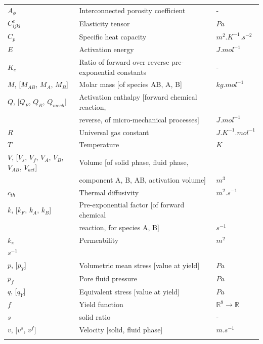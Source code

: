 \documentclass[]{scrreprt}
\begin{document}
\begin{table}
\begin{tabular}{lll}
\hline
$A_{\phi}$ & Interconnected porosity coefficient & - \\
$C^e_{ijkl}$ & Elasticity tensor & $Pa$ \\
$C_p$ & Specific heat capacity & $m^2.K^{-1}.s^{-2}$ \\
$E$ & Activation energy & $J.mol^{-1}$ \\
$K_c$ & Ratio of forward over reverse pre-exponential constants & - \\
$M$, [$M_{AB}$, $M_{A}$, $M_{B}$] & Molar mass [of species AB, A, B] & $kg.mol^{-1}$ \\
$Q$, [$Q_{F}$, $Q_{R}$, $Q_{mech}$] & Activation enthalpy [forward chemical reaction, \\ 
     & reverse, of micro-mechanical processes] & $J.mol^{-1}$ \\
$R$ & Universal gas constant & $J.K^{-1}.mol^{-1}$ \\
$T$ & Temperature & $K$ \\
$V$, [$V_{s}$, $V_{f}$, $V_{A}$, $V_{B}$, $V_{AB}$, $V_{act}$] & Volume [of solid phase, fluid phase, \\ & component A, B, AB, activation volume] & $m^3$ \\

\hline
$c_{th}$ & Thermal diffusivity & $m^{2}.s^{-1}$ \\
$k$, [$k_{F}$, $k_{A}$, $k_{B}$] & Pre-exponential factor [of forward chemical  \\ & reaction, for species A, B] & $s^{-1}$\\
$k_{\pi}$ & Permeability & $m^2$ \\
$s^{-1}$ \\
$p$, [$p_Y$] & Volumetric mean stress [value at yield] & $Pa$ \\
$p_f$ & Pore fluid pressure & $Pa$ \\
$q$, [$q_Y$] & Equivalent stress [value at yield] & $Pa$ \\
$f$ & Yield function & $\mathbb{R}^9 \longrightarrow \mathbb{R}$ \\
$s$ & solid ratio & - \\
$v$, [$v^s$, $v^f$] & Velocity [solid, fluid phase] & $m.s^{-1}$ \\

\noalign{\smallskip}\hline
\end{tabular}
\end{table}


%

\nocite{*}
\end{document}
